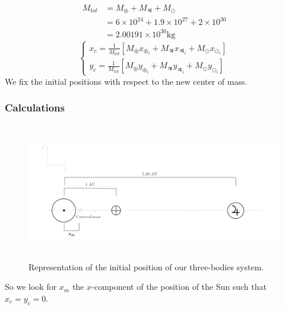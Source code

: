 \documentclass[a4paper, twoside, 11pt]{report}
\theoremstyle{theorem}
\theoremstyle{remark}
\theoremstyle{exemple}
\begin{document}
                \begin{align*}
                    M_{tot} &= M_{\oplus} + M_{\jupiter} + M_{\odot} \\
                    &= 6\times10^{24} + 1.9\times 10^{27} + 2 \times 10^{30}\\
                    &= 2.00191 \times 10^{30} \mathrm{kg}
                \end{align*}
                \begin{equation*}
                    \left\{
                        \begin{aligned}
                            x_c = \frac{1}{M_{tot}} [M_{\oplus} x_{\oplus_i} + M_{\jupiter} x_{\jupiter_i} + M_{\odot} x_{\odot_i}] \\
                            y_c = \frac{1}{M_{tot}} [M_{\oplus} y_{\oplus_i} + M_{\jupiter} y_{\jupiter_i} + M_{\odot} y_{\odot_i}]
                        \end{aligned}
                    \right.
                \end{equation*} 
            We fix the initial positions with respect to the new center of mass.
            
            \subsubsection{Calculations}
            
                \begin{center}
                \begin{figure}[h!]
                    \includegraphics[width=16cm,height=6cm]{dessinplanete.png}
                    \caption{Representation of the initial position of our three-bodies system.}
                \end{figure}
                \end{center}
                
            So we look for $x_m$ the $x$-component of the position of the Sun such that $x_c=y_c=0$.
            
\end{document}
